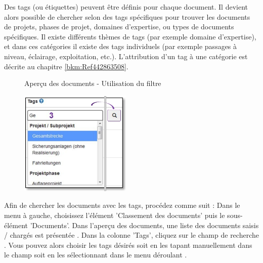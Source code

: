 Des tags (ou étiquettes) peuvent être définis pour chaque document. Il devient alors possible de chercher selon des tags spécifiques pour trouver les documents de projets, phases de projet, domaines d'expertise, ou types de documents spécifiques. Il existe différents thèmes de tags (par exemple domaine d'expertise), et dans ces catégories il existe des tags individuels (par exemple passages à niveau, éclairage, exploitation, etc.). L'attribution d'un tag à une catégorie est décrite au chapitre \ref{bkm:Ref442863508}.

\begin{figure}[H]
\caption{Aperçu des documents - Utilisation du filtre}
\end{figure}

\pagebreak

\begin{figure}
\vspace{-10pt}
\includegraphics[height=50mm]{../chapters/11_Dokumentenablage/pictures/11-2-8_DokTagHinzufuegen.jpg}
\end{figure}
Afin de chercher les documents avec les tags, procédez comme suit : 
Dans le menu à gauche, choisissez l'élément 'Classement des documents' puis le sous-élément 'Documents'. Dans l'aperçu des documents, une liste des documents saisis / chargés est présentée . Dans la colonne 'Tags', cliquez sur le champ de recherche . Vous pouvez alors choisir les tags désirés soit en les tapant manuellement dans le champ soit en les sélectionnant dans le menu déroulant .


